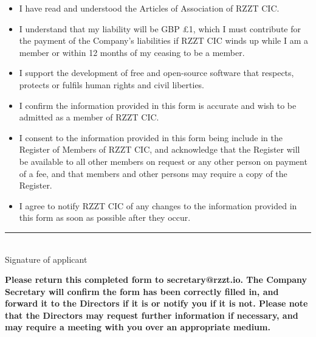 \documentclass[a4paper,10pt]{article}
\begin{document}
\begin{Form}
\begin{itemize}
  \renewcommand{\labelitemi}{\CheckBox[name=articles]{ }}
  \item I have read and understood the Articles of Association of RZZT CIC.
  \renewcommand{\labelitemi}{\CheckBox[name=liability]{ }}
  \item I understand that my liability will be GBP £1, which I must contribute for the payment of the Company's liabilities if RZZT CIC winds up while I am a member or within 12 months of my ceasing to be a member.
  \renewcommand{\labelitemi}{\CheckBox[name=supportfoss]{ }}
  \item I support the development of free and open-source software that respects, protects or fulfils human rights and civil liberties.
  \renewcommand{\labelitemi}{\CheckBox[name=infoaccurate]{ }}
  \item I confirm the information provided in this form is accurate and wish to be admitted as a member of RZZT CIC.
  \renewcommand{\labelitemi}{\CheckBox[name=consent]{ }}
  \item I consent to the information provided in this form being include in the Register of Members of RZZT CIC, and acknowledge that the Register will be available to all other members on request or any other person on payment of a fee, and that members and other persons may require a copy of the Register.
  \renewcommand{\labelitemi}{\CheckBox[name=notify]{ }}
  \item I agree to notify RZZT CIC of any changes to the information provided in this form as soon as possible after they occur.
\end{itemize}

\vspace{\fill}
\rule{0.5\textwidth}{0.5pt}\\
Signature of applicant

\vspace{\fill}

\textbf{Please return this completed form to secretary@rzzt.io. The Company Secretary will confirm the form has been correctly filled in, and forward it to the Directors if it is or notify you if it is not. Please note that the Directors may request further information if necessary, and may require a meeting with you over an appropriate medium.}

\end{Form}
\end{document}

